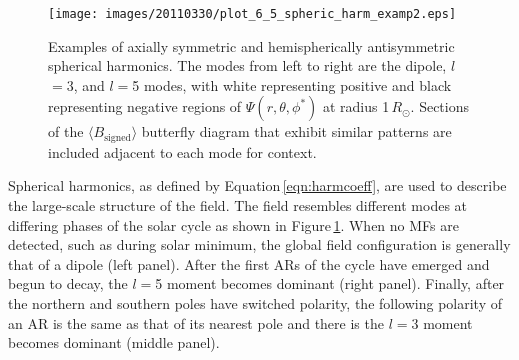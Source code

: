 \documentclass[namedreferences]{solarphysics}
\begin{document}
\begin{article}


\begin{figure}[!t]
\begin{center}
\texttt{[image: images/20110330/plot\_6\_5\_spheric\_harm\_examp2.eps]}
\end{center}
\caption{Examples of axially symmetric and hemispherically antisymmetric spherical harmonics. The modes from left to right are the dipole, $l$$=$3, and $l$$=$5 modes, with white representing positive and black representing negative regions of $\Psi(r,\theta,\phi^*)$ at radius 1\,$R_{\odot}$. Sections of the $\langle B_{\mathrm{signed}} \rangle$ butterfly diagram that exhibit similar patterns are included adjacent to each mode for context.}
\label{plot_6_5_spheric_harm_examp}
\end{figure}

Spherical harmonics, as defined by Equation\,\ref{eqn:harmcoeff}, are used to describe the large-scale structure of the field. The field resembles different modes at differing phases of the solar cycle as shown in Figure\,\ref{plot_6_5_spheric_harm_examp}. When no MFs are detected, such as during solar minimum, the global field configuration is generally that of a dipole (left panel). After the first ARs of the cycle have emerged and begun to decay, the $l$$=$5 moment becomes dominant (right panel). Finally, after the northern and southern poles have switched polarity, the following polarity of an AR is the same as that of its nearest pole and there is the $l$$=$3 moment becomes dominant (middle panel).



\end{article}
\end{document}
